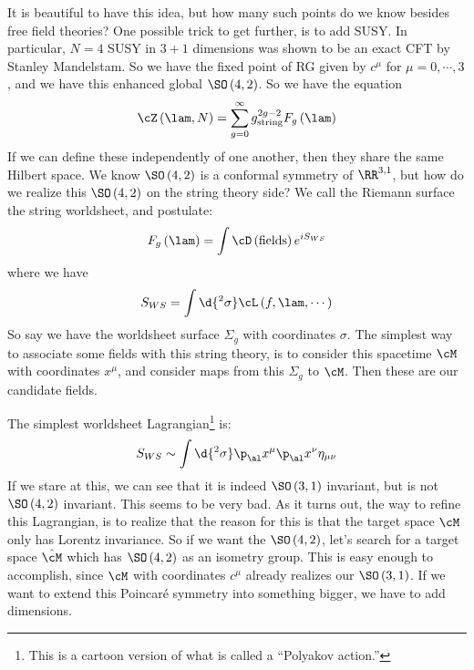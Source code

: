 \documentclass{booc}
\begin{document}
It is beautiful to have this idea, but how many such points do we know besides free field theories?
One possible trick to get further, is to add SUSY. 
In particular, $N=4$ SUSY in $3+1$ dimensions was shown to be an exact CFT by Stanley Mandelstam.
So we have the fixed point of RG given by $c^\mu$ for $\mu = 0 , \cdots , 3$,
and we have this enhanced global $\SO\left( 4 , 2 \right)$. 
So we have the equation
\begin{equation}
\cZ\left( \lam , N \right) = \sum_{g = 0}^\infty 
g_{\text{string}}^{2g - 2}
F_g\left( \lam \right)
\end{equation}
If we can define these independently of one another, then they share the same Hilbert space.
We know $\SO\left( 4,2 \right)$ is a conformal symmetry of $\RR^{3,1}$,
but how do we realize this $\SO\left( 4,2 \right)$ on the string theory side?
We call the Riemann surface the string worldsheet, and postulate:
\begin{equation}
F_g\left( \lam \right) = \int \cD \left( \text{fields} \right) 
e^{iS_{WS}}
\end{equation}
where we have
\begin{equation}
S_{WS} = \int \d{^2 \sigma} \cL\left( f , \lam , \cdots \right)
\end{equation}
So say we have the worldsheet surface $\Sigma_g$ with coordinates $\sigma$. 
The simplest way to associate some fields with this string theory, is
to consider this spacetime $\cM$ with coordinates $x^\mu$, 
and consider maps from this $\Sigma_g$ to $\cM$. Then these are our candidate fields. 

The simplest worldsheet Lagrangian\footnote{
This is a cartoon version of what is called a ``Polyakov action.''}
is:
\begin{equation}
S_{WS} \sim \int \d{^2 \sigma} \p_\al x^\mu \p_\al x^\nu \eta_{\mu\nu}
\end{equation}
If we stare at this, we can see that it is indeed $\SO\left( 3,1 \right)$ invariant,
but is not $\SO\left( 4,2 \right)$ invariant. This seems to be very bad. 
As it turns out, the way to refine this Lagrangian, is to realize that the reason for this
is that the target space $\cM$ only has Lorentz invariance. So if we want the $\SO\left( 4,2 \right)$,
let's search for a target space $\hat \cM$ which has $\SO\left( 4,2 \right)$ as an isometry group.
This is easy enough to accomplish, since $\cM$ with coordinates $c^\mu$ 
already realizes our $\SO\left( 3,1 \right)$.
If we want to extend this Poincar\'e symmetry into something bigger, we have to add dimensions. 
\end{document}

